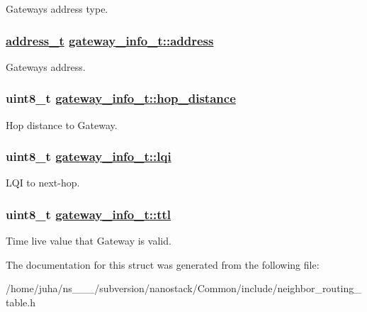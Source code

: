 Gateways address type. \hypertarget{structgateway__info__t_cf46061809e578c4acf9efe936340e6d}{
\subsubsection[address]{\setlength{\rightskip}{0pt plus 5cm}\hyperlink{address_8h_65ce5a1faf29ab669a1d3dc6ce26c2ab}{address\_\-t} \hyperlink{structgateway__info__t_cf46061809e578c4acf9efe936340e6d}{gateway\_\-info\_\-t::address}}}
\label{structgateway__info__t_cf46061809e578c4acf9efe936340e6d}


Gateways address. \hypertarget{structgateway__info__t_93b635756750f6abf21486d5b408e666}{
\subsubsection[hop\_\-distance]{\setlength{\rightskip}{0pt plus 5cm}uint8\_\-t \hyperlink{structgateway__info__t_93b635756750f6abf21486d5b408e666}{gateway\_\-info\_\-t::hop\_\-distance}}}
\label{structgateway__info__t_93b635756750f6abf21486d5b408e666}


Hop distance to Gateway. \hypertarget{structgateway__info__t_4075557274a491d052944514dff46f47}{
\subsubsection[lqi]{\setlength{\rightskip}{0pt plus 5cm}uint8\_\-t \hyperlink{structgateway__info__t_4075557274a491d052944514dff46f47}{gateway\_\-info\_\-t::lqi}}}
\label{structgateway__info__t_4075557274a491d052944514dff46f47}


LQI to next-hop. \hypertarget{structgateway__info__t_bf2c4546f04ee1131d3ff827921844e0}{
\subsubsection[ttl]{\setlength{\rightskip}{0pt plus 5cm}uint8\_\-t \hyperlink{structgateway__info__t_bf2c4546f04ee1131d3ff827921844e0}{gateway\_\-info\_\-t::ttl}}}
\label{structgateway__info__t_bf2c4546f04ee1131d3ff827921844e0}


Time live value that Gateway is valid. 

The documentation for this struct was generated from the following file:\begin{CompactItemize}
\item 
/home/juha/ns\_\_\_/subversion/nanostack/Common/include/neighbor\_\-routing\_\-table.h\end{CompactItemize}

